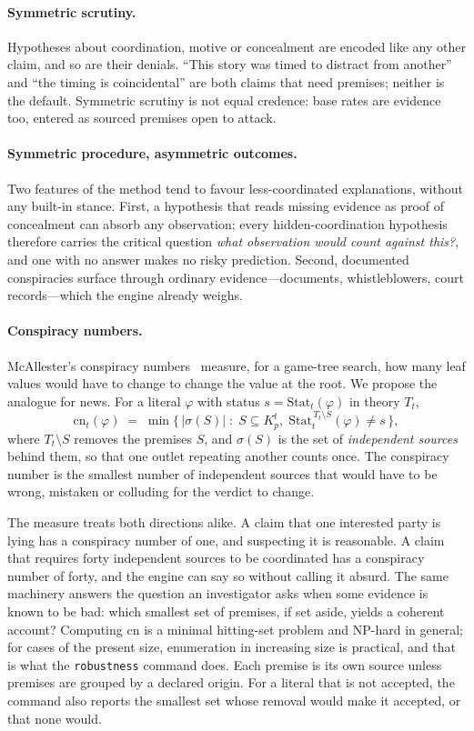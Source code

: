 \documentclass[11pt]{article}
\newcommand{\cmd}[1]{\texttt{#1}}
\begin{document}
\paragraph{Symmetric scrutiny.}
Hypotheses about coordination, motive or concealment are encoded like
any other claim, and so are their denials. ``This story was timed to
distract from another'' and ``the timing is coincidental'' are both
claims that need premises; neither is the default. Symmetric scrutiny
is not equal credence: base rates are evidence too, entered as sourced
premises open to attack.

\paragraph{Symmetric procedure, asymmetric outcomes.}
Two features of the method tend to favour less-coordinated explanations,
without any built-in stance. First, a hypothesis that reads missing
evidence as proof of concealment can absorb any observation; every
hidden-coordination hypothesis therefore carries the critical question
\emph{what observation would count against this?}, and one with no
answer makes no risky prediction. Second, documented conspiracies
surface through ordinary evidence---documents, whistleblowers, court
records---which the engine already weighs.

\paragraph{Conspiracy numbers.}
McAllester's conspiracy numbers~\cite{mcallester} measure, for a
game-tree search, how many leaf values would have to change to change
the value at the root. We propose the analogue for news. For a literal
$\varphi$ with status $s=\mathrm{Stat}_t(\varphi)$ in theory $T_t$,
\[
  \mathrm{cn}_t(\varphi) \;=\; \min\bigl\{\, |\sigma(S)| \;:\; S \subseteq K_p^t,\;
  \mathrm{Stat}_t^{\,T_t \setminus S}(\varphi) \neq s \,\bigr\},
\]
where $T_t\setminus S$ removes the premises $S$, and $\sigma(S)$ is the
set of \emph{independent sources} behind them, so that one outlet
repeating another counts once. The conspiracy number is the smallest
number of independent sources that would have to be wrong, mistaken or
colluding for the verdict to change.

The measure treats both directions alike. A claim that one interested
party is lying has a conspiracy number of one, and suspecting it is
reasonable. A claim that requires forty independent sources to be
coordinated has a conspiracy number of forty, and the engine can say so
without calling it absurd. The same machinery answers the question an
investigator asks when some evidence is known to be bad: which smallest
set of premises, if set aside, yields a coherent account? Computing
$\mathrm{cn}$ is a minimal hitting-set problem and NP-hard in general;
for cases of the present size, enumeration in increasing size is
practical, and that is what the \cmd{robustness} command does. Each
premise is its own source unless premises are grouped by a declared
origin. For a literal that is not accepted, the command also reports the
smallest set whose removal would make it accepted, or that none would.
\end{document}
